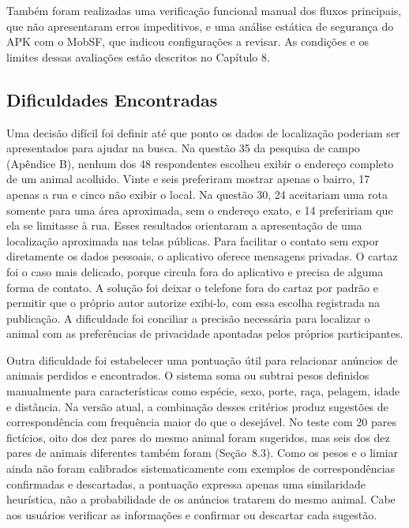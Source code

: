 Também foram realizadas uma verificação funcional manual dos fluxos principais, que não apresentaram erros impeditivos, e uma análise estática de segurança do APK com o MobSF, que indicou configurações a revisar. As condições e os limites dessas avaliações estão descritos no Capítulo 8.

\subsection{Dificuldades Encontradas}

Uma decisão difícil foi definir até que ponto os dados de localização poderiam ser apresentados para ajudar na busca. Na questão 35 da pesquisa de campo (Apêndice B), nenhum dos 48 respondentes escolheu exibir o endereço completo de um animal acolhido. Vinte e seis preferiram mostrar apenas o bairro, 17 apenas a rua e cinco não exibir o local. Na questão 30, 24 aceitariam uma rota somente para uma área aproximada, sem o endereço exato, e 14 prefeririam que ela se limitasse à rua. Esses resultados orientaram a apresentação de uma localização aproximada nas telas públicas. Para facilitar o contato sem expor diretamente os dados pessoais, o aplicativo oferece mensagens privadas. O cartaz foi o caso mais delicado, porque circula fora do aplicativo e precisa de alguma forma de contato. A solução foi deixar o telefone fora do cartaz por padrão e permitir que o próprio autor autorize exibi-lo, com essa escolha registrada na publicação. A dificuldade foi conciliar a precisão necessária para localizar o animal com as preferências de privacidade apontadas pelos próprios participantes.

Outra dificuldade foi estabelecer uma pontuação útil para relacionar anúncios de animais perdidos e encontrados. O sistema soma ou subtrai pesos definidos manualmente para características como espécie, sexo, porte, raça, pelagem, idade e distância. Na versão atual, a combinação desses critérios produz sugestões de correspondência com frequência maior do que o desejável. No teste com 20 pares fictícios, oito dos dez pares do mesmo animal foram sugeridos, mas seis dos dez pares de animais diferentes também foram (Seção~8.3). Como os pesos e o limiar ainda não foram calibrados sistematicamente com exemplos de correspondências confirmadas e descartadas, a pontuação expressa apenas uma similaridade heurística, não a probabilidade de os anúncios tratarem do mesmo animal. Cabe aos usuários verificar as informações e confirmar ou descartar cada sugestão.

